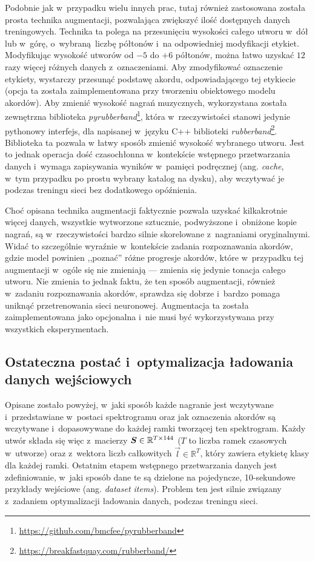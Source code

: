 Podobnie jak w~przypadku wielu innych prac, tutaj również zastosowana została prosta technika augmentacji, pozwalająca zwiększyć ilość dostępnych danych treningowych. Technika ta polega na przesunięciu wysokości całego utworu w~dół lub w~górę, o~wybraną liczbę półtonów i~na odpowiedniej modyfikacji etykiet. Modyfikując wysokość utworów od $-5$ do $+6$ półtonów, można łatwo uzyskać $12$ razy więcej różnych danych z~oznaczeniami. Aby zmodyfikować oznaczenie etykiety, wystarczy przesunąć podstawę akordu, odpowiadającego tej etykiecie (opcja ta została zaimplementowana przy tworzeniu obiektowego modelu akordów). Aby zmienić wysokość nagrań muzycznych, wykorzystana została zewnętrzna biblioteka \emph{pyrubberband}\footnote{\url{https://github.com/bmcfee/pyrubberband}}, która w~rzeczywistości stanowi jedynie pythonowy interfejs, dla napisanej w~języku C++ biblioteki \emph{rubberband}\footnote{\url{https://breakfastquay.com/rubberband/}}. Biblioteka ta pozwala w łatwy sposób zmienić wysokość wybranego utworu. Jest to jednak operacja dość czasochłonna w~kontekście wstępnego przetwarzania danych i~wymaga zapisywania wyników w~pamięci podręcznej (ang. \emph{cache}, w~tym przypadku po prostu wybrany katalog na dysku), aby wczytywać je podczas treningu sieci bez dodatkowego opóźnienia.

Choć opisana technika augmentacji faktycznie pozwala uzyskać kilkakrotnie więcej danych, wszystkie wytworzone sztucznie, podwyższone i~obniżone kopie nagrań, są w~rzeczywistości bardzo silnie skorelowane z~nagraniami oryginalnymi. Widać to szczególnie wyraźnie w~kontekście zadania rozpoznawania akordów, gdzie model powinien ,,poznać'' różne progresje akordów, które w~przypadku tej augmentacji w~ogóle się nie zmieniają --- zmienia się jedynie tonacja całego utworu. Nie zmienia to jednak faktu, że ten sposób augmentacji, również w~zadaniu rozpoznawania akordów, sprawdza się dobrze i~bardzo pomaga uniknąć przetrenowania sieci neuronowej. Augmentacja ta została zaimplementowana jako opcjonalna i~nie musi być wykorzystywana przy wszystkich eksperymentach.

\subsection{Ostateczna postać i~optymalizacja ładowania danych wejściowych}

Opisane zostało powyżej, w~jaki sposób każde nagranie jest wczytywane i~przedstawiane w~postaci spektrogramu oraz jak oznaczenia akordów są wczytywane i~dopasowywane do każdej ramki tworzącej ten spektrogram. Każdy utwór składa się więc z~macierzy $\boldsymbol{S} \in \mathbb{R}^{T \times 144}$ ($T$ to liczba ramek czasowych w~utworze) oraz z~wektora liczb całkowitych $\vec l \in \mathbb{R}^T$, który zawiera etykietę klasy dla każdej ramki. Ostatnim etapem wstępnego przetwarzania danych jest zdefiniowanie, w~jaki sposób dane te są dzielone na pojedyncze, 10-sekundowe przykłady wejściowe (ang. \emph{dataset items}). Problem ten jest silnie związany z~zadaniem optymalizacji ładowania danych, podczas treningu sieci.

